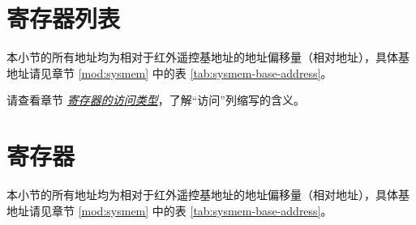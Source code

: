 \documentclass[main\_\_CN.tex]{subfiles}
\begin{document}



\clearpage
\hypertarget{rmt-reg-summ}{}
\section{寄存器列表}
\label{sec:rmt-reg-summ}

本小节的所有地址均为相对于红外遥控基地址的地址偏移量（相对地址），具体基地址请见章节 \ref{mod:sysmem} \textit{} 中的表 \ref{tab:sysmem-base-address}。

请查看章节 \hyperref[glossary-access-types]{\textit{寄存器的访问类型}}，了解“访问”列缩写的含义。





\clearpage
\section{寄存器}

本小节的所有地址均为相对于红外遥控基地址的地址偏移量（相对地址），具体基地址请见章节 \ref{mod:sysmem} \textit{} 中的表 \ref{tab:sysmem-base-address}。


\end{document}
